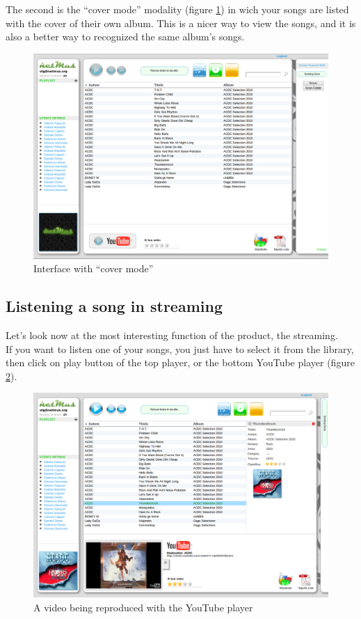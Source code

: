 The second is the ``cover mode'' modality (figure
\ref{fig:coverMode}) in wich your songs are listed with
the cover of their own album. This is a nicer way to view the songs, and it is also
a better way to recognized the same album's songs.\\

\begin{figure}[!htbp]
  \centering
  \includegraphics[width=14cm]{img/MU/song_loaded.png}
\caption{Interface with ``cover mode''}
\label{fig:coverMode}
\end{figure}

\subsection{Listening a song in streaming}

Let's look now at the most interesting function of the
product, the streaming.\\
If you want to listen one of your songs, you just have to select it from the
library, then click on play button of the top player, or the
bottom YouTube player (figure \ref{fig:play}).\\
\begin{figure}[!htbp]
  \centering
  \includegraphics[width=15cm]{img/MU/player_youtube.png}
\caption{A video being reproduced with the YouTube player}
\label{fig:play}
\end{figure} 

